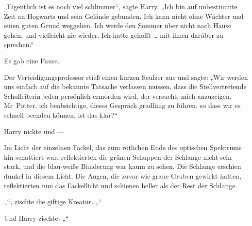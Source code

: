 „Eigentlich ist es noch viel schlimmer“, sagte Harry.
„Ich bin auf unbestimmte Zeit an Hogwarts und sein Gelände gebunden. Ich kann nicht ohne Wächter und einen guten Grund weggehen. Ich werde den Sommer über nicht nach Hause gehen, und vielleicht nie wieder. Ich hatte gehofft … mit ihnen darüber zu sprechen.“

Es gab eine Pause.

Der Verteidigungsprofessor stieß einen kurzen Seufzer aus und sagte:
„Wir werden uns einfach auf die bekannte Tatsache verlassen müssen, dass die Stellvertretende Schulleiterin jeden persönlich ermorden wird, der versucht, mich anzuzeigen. Mr~Potter, ich beabsichtige, dieses Gespräch gradlinig zu führen, so dass wir es schnell beenden können, ist das klar?“

Harry nickte und —

Im Licht der einzelnen Fackel, das zum rötlichen Ende des optischen Spektrums hin schattiert war, reflektierten die grünen Schuppen der Schlange nicht sehr stark, und die blau-weiße Bänderung war kaum zu sehen. Die Schlange erschien dunkel in diesem Licht. Die Augen, die zuvor wie graue Gruben gewirkt hatten, reflektierten nun das Fackellicht und schienen heller als der Rest der Schlange.

„“, zischte die giftige Kreatur. „“

Und Harry zischte: „“

